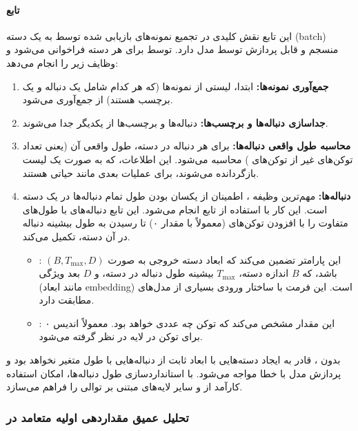 \documentclass{article}
\begin{document}
\paragraph{تابع }
این تابع نقش کلیدی در تجمیع نمونه‌های بازیابی شده توسط  به یک دسته (batch) منسجم و قابل پردازش توسط مدل دارد.  توسط  برای هر دسته فراخوانی می‌شود و وظایف زیر را انجام می‌دهد:
\begin{enumerate}
	\item \textbf{جمع‌آوری نمونه‌ها:} ابتدا، لیستی از نمونه‌ها (که هر کدام شامل یک دنباله و یک برچسب هستند) از  جمع‌آوری می‌شود.
	\item \textbf{جداسازی دنباله‌ها و برچسب‌ها:} دنباله‌ها و برچسب‌ها از یکدیگر جدا می‌شوند.
	\item \textbf{محاسبه طول واقعی دنباله‌ها:} برای هر دنباله در دسته، طول واقعی آن (یعنی تعداد توکن‌های غیر از توکن‌های ) محاسبه می‌شود. این اطلاعات، که به صورت یک لیست بازگردانده می‌شوند، برای عملیات بعدی مانند  حیاتی هستند.
	\item \textbf{ دنباله‌ها:} مهم‌ترین وظیفه ، اطمینان از یکسان بودن طول تمام دنباله‌ها در یک دسته است. این کار با استفاده از تابع  انجام می‌شود. این تابع دنباله‌های با طول‌های متفاوت را با افزودن توکن‌های  (معمولاً با مقدار ۰) تا رسیدن به طول بیشینه دنباله در آن دسته، تکمیل می‌کند.
	\begin{itemize}
		\item {}: این پارامتر تضمین می‌کند که ابعاد دسته خروجی به صورت \((B, T_{\max}, D)\) باشد، که \(B\) اندازه دسته، \(T_{\max}\) بیشینه طول دنباله در دسته، و \(D\) بعد ویژگی (مانند ابعاد embedding) است. این فرمت با ساختار ورودی بسیاری از مدل‌های  مطابقت دارد.
		\item {}: این مقدار مشخص می‌کند که توکن  چه عددی خواهد بود. معمولاً اندیس ۰ برای توکن  در لایه  در نظر گرفته می‌شود.
	\end{itemize}
\end{enumerate}
بدون ،  قادر به ایجاد دسته‌هایی با ابعاد ثابت از دنباله‌هایی با طول متغیر نخواهد بود و پردازش مدل با خطا مواجه می‌شود.  با استانداردسازی طول دنباله‌ها، امکان استفاده کارآمد از  و سایر لایه‌های مبتنی بر توالی را فراهم می‌سازد.

\subsubsection{تحلیل عمیق مقداردهی اولیه متعامد در }
\end{document}
